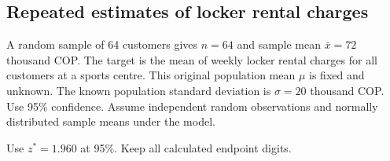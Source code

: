 \subsection{Repeated estimates of locker rental charges}
\label{prob:c2-1}

A random sample of 64 customers gives $n=64$ and sample mean $\bar{x}=72$ thousand COP. The target is the mean of weekly locker rental charges for all customers at a sports centre. This original population mean $\mu$ is fixed and unknown. The known population standard deviation is $\sigma=20$ thousand COP. Use 95\% confidence. Assume independent random observations and normally distributed sample means under the model.

Use $z^*=1.960$ at 95\%. Keep all calculated endpoint digits.

